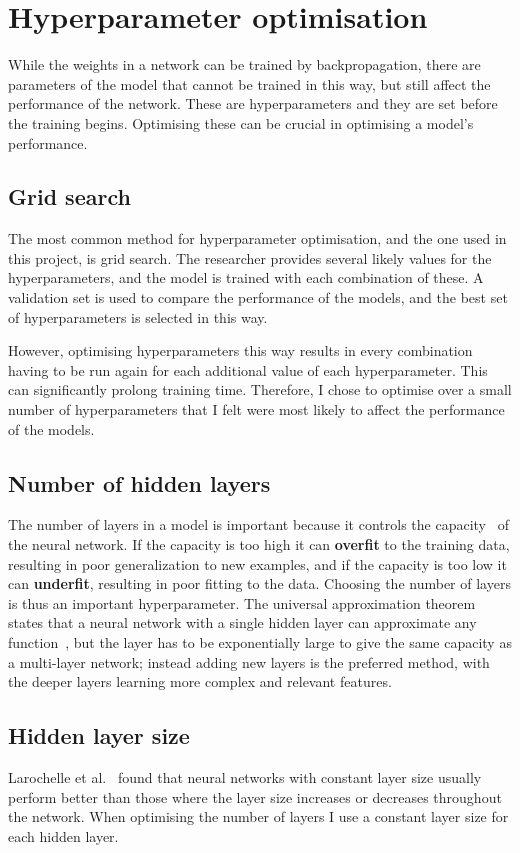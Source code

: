 \section{Hyperparameter optimisation} \label{hyper}
While the weights in a network can be trained by backpropagation, there are parameters of the model that cannot be trained in 
this way, but still affect the performance of the network. These are hyperparameters and they are set before the training begins. 
Optimising these can be crucial in optimising a model's performance.

\subsection{Grid search}
The most common method for hyperparameter optimisation, and the one used in this project, is grid search. The researcher provides several 
likely values for the hyperparameters, and the model is trained with each combination of these. A validation set is used to compare the
performance of the models, and the best set of hyperparameters is selected in this way.

However, optimising hyperparameters this way results in every combination having to be run again for each additional value of each
hyperparameter. This can significantly prolong training time. 
Therefore, I chose to optimise over a small number of hyperparameters that I felt were most likely to affect the performance of the models.

\subsection{Number of hidden layers}
The number of layers in a model is important because it controls the capacity~\cite{Goodfellow-et-al-2016} of the neural network. If the 
capacity is too high it can \textbf{overfit} to the training data, resulting in poor generalization to new examples, and if the capacity is 
too low it can \textbf{underfit}, resulting in poor fitting to the data. Choosing the number of layers is thus an important hyperparameter.
The universal approximation theorem states that a neural network with a single hidden layer can approximate any function~\cite{DBLP:journals/mcss/Cybenko92}, but the layer 
has to be exponentially large to give the same capacity as a multi-layer network; instead adding new layers is the preferred method, 
with the deeper layers learning more complex and relevant features.

\subsection{Hidden layer size}
Larochelle et al.~\cite{DBLP:journals/jmlr/LarochelleBLL09} found that neural networks with constant layer size usually perform better than
those where the layer size increases or decreases throughout the network. When optimising the number of layers I use a constant layer size
for each hidden layer.

